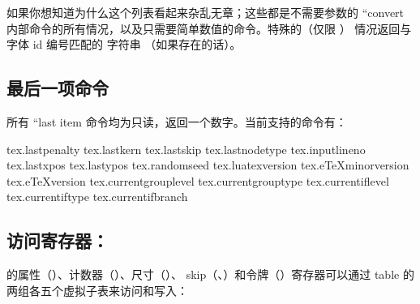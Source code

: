 如果你想知道为什么这个列表看起来杂乱无章；这些都是不需要参数的 ``convert 内部命令的所有情况，以及只需要简单数值的命令。特殊的（仅限 \LUA）
 情况返回与字体 id 编号匹配的  字符串
（如果存在的话）。

\subsection{最后一项命令}


所有 ``last item 命令均为只读，返回一个数字。当前支持的命令有：

\startthreecolumns
\begin{typing}
tex.lastpenalty
tex.lastkern
tex.lastskip
tex.lastnodetype
tex.inputlineno
tex.lastxpos
tex.lastypos
tex.randomseed
tex.luatexversion
tex.eTeXminorversion
tex.eTeXversion
tex.currentgrouplevel
tex.currentgrouptype
tex.currentiflevel
tex.currentiftype
tex.currentifbranch
\end{typing}
\stopthreecolumns

\subsection{访问寄存器：}


      
                  
                  
                     
               
                     
               
                     
                        



\TEX 的属性（）、计数器（）、尺寸（）、
skip（、）和令牌（）寄存器可以通过
 table 的两组各五个虚拟子表来访问和写入：

